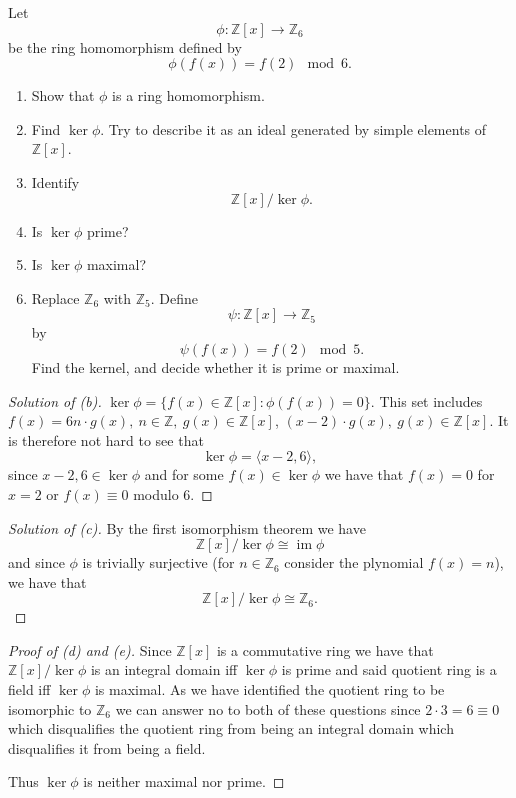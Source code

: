 \begin{prob}
    Let 
    \[
        \phi : \mathbb Z[x] \to \mathbb Z_6
    \]
    be the ring homomorphism defined by 
    \[
        \phi(f(x)) = f(2) \mod 6. 
    \]

    \begin{enumerate}[label=\alph*)]
        \item Show that $\phi$ is a ring homomorphism. 
        \item Find $\ker \phi$. 
            Try to describe it as an ideal generated by 
            simple elements of $\mathbb Z[x]$. 
        \item Identify 
            \[
                \mathbb Z[x] / \ker \phi. 
            \]
        \item Is $\ker \phi$ prime? 
        \item Is $\ker \phi$ maximal? 
        \item Replace $\mathbb Z_6$ with $\mathbb Z_5$. Define 
            \[
                \psi : \mathbb Z[x] \to \mathbb Z_5
            \]
            by 
            \[
                \psi(f(x)) = f(2) \mod 5. 
            \]
            Find the kernel, and decide whether it is 
            prime or maximal.
    \end{enumerate}
\end{prob}
\begin{proof}[Solution of (b)]
    $\ker \phi = \{f(x) \in \mathbb Z[x] : \phi(f(x)) = 0\}$. This set includes 
    $f(x) = 6n \cdot g(x), \ n \in \mathbb Z, \ g(x) \in \mathbb Z[x]$,
    $(x-2) \cdot g(x), \ g(x) \in \mathbb Z[x]$. 
    It is therefore not hard to see that 
    \[
        \ker \phi = \langle x-2, 6 \rangle, 
    \]
    since $x-2, 6 \in \ker \phi$ and for some 
    $f(x) \in \ker \phi$ we have that 
    $f(x) = 0$ for $x = 2$ or $f(x) \equiv 0$ 
    modulo $6$. 
\end{proof}
\begin{proof}[Solution of (c)]
    By the first isomorphism theorem we have 
    \[
        \mathbb Z[x] / \ker \phi \cong \operatorname{im} \phi
    \]
    and since $\phi$ is trivially surjective 
    (for $n \in \mathbb Z_6$ consider the plynomial 
    $f(x) = n$), we have that 
    \[
        \mathbb Z[x] / \ker \phi \cong \mathbb Z_6.
    \]
\end{proof}
\begin{proof}[Proof of (d) and (e)]
    Since $\mathbb Z[x]$ is a commutative ring 
    we have that $\mathbb Z[x]/\ker \phi$ is 
    an integral domain iff $\ker \phi$ is 
    prime and said quotient ring is 
    a field iff $\ker \phi$ is maximal.
    As we have identified the quotient ring 
    to be isomorphic to $\mathbb Z_6$ we can 
    answer no to both of these questions since 
    $2 \cdot 3 = 6 \equiv 0$ which disqualifies 
    the quotient ring from being an integral domain 
    which disqualifies it from being a field. 
    
    Thus $\ker \phi$ is neither maximal nor prime. 
\end{proof}
